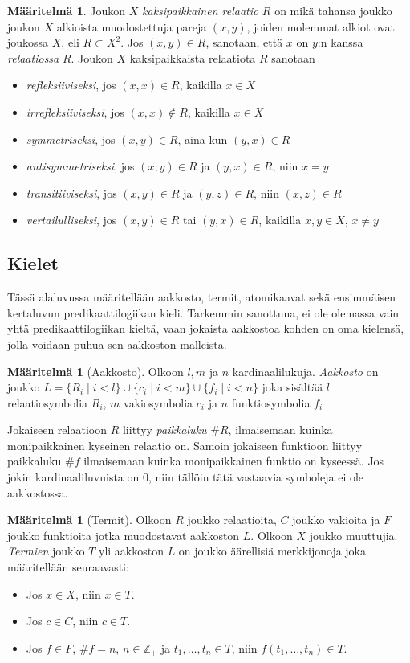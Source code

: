 \documentclass[finnish]{tktltiki2}
\theoremstyle{definition}
\newtheorem{maar}[lau]{Määritelmä}
\theoremstyle{remark}
\begin{document}
\begin{maar}
Joukon $X$ \textit{kaksipaikkainen relaatio} $R$ on mikä tahansa joukko joukon $X$ alkioista muodostettuja pareja $(x, y)$, joiden molemmat alkiot ovat joukossa $X$, eli $R \subset X^2$.  Jos $(x, y) \in R$, sanotaan, että $x$ on $y$:n kanssa \textit{relaatiossa} $R$. Joukon $X$ kaksipaikkaista relaatiota $R$ sanotaan
\begin{itemize}
\item \textit{refleksiiviseksi}, jos $(x, x) \in R$, kaikilla $x \in X$
\item \textit{irrefleksiiviseksi}, jos $(x, x) \notin R$, kaikilla $x \in X$
\item \textit{symmetriseksi}, jos $(x, y) \in R$, aina kun $(y, x) \in R$
\item \textit{antisymmetriseksi}, jos $(x, y) \in R$ ja $(y, x) \in R$, niin $x = y$
\item \textit{transitiiviseksi}, jos $(x, y) \in R$ ja $(y, z) \in R$, niin $(x, z) \in R$
\item \textit{vertailulliseksi}, jos $(x, y) \in R$ tai $(y, x) \in R$, kaikilla $x, y \in X$, $x \neq y$
\end{itemize}
\end{maar}

\subsection{Kielet}
Tässä alaluvussa määritellään aakkosto, termit, atomikaavat sekä ensimmäisen kertaluvun predikaattilogiikan kieli. Tarkemmin sanottuna, ei ole olemassa vain yhtä predikaattilogiikan kieltä, vaan jokaista aakkostoa kohden on oma kielensä, jolla voidaan puhua sen aakkoston malleista.

\begin{maar}[Aakkosto]
Olkoon $l, m$ ja $n$ kardinaalilukuja. \textit{Aakkosto} on joukko $L = \{R_i \mid i < l\} \cup \{c_i \mid i < m\} \cup \{f_i \mid i < n\}$ joka sisältää $l$ relaatiosymbolia $R_i$, $m$ vakiosymbolia $c_i$ ja $n$ funktiosymbolia $f_i$
\end{maar}
Jokaiseen relaatioon $R$ liittyy \textit{paikkaluku} $\#R$, ilmaisemaan kuinka monipaikkainen kyseinen relaatio on. Samoin jokaiseen funktioon liittyy paikkaluku $\#f$ ilmaisemaan kuinka monipaikkainen funktio on kyseessä. Jos jokin kardinaaliluvuista on $0$, niin tällöin tätä vastaavia symboleja ei ole aakkostossa.

\begin{maar}[Termit]
Olkoon $R$ joukko relaatioita, $C$ joukko vakioita ja $F$ joukko funktioita jotka muodostavat aakkoston $L$. Olkoon $X$ joukko muuttujia. \textit{Termien} joukko $T$ yli aakkoston $L$ on joukko äärellisiä merkkijonoja joka määritellään seuraavasti:
\begin{itemize}
\item Jos $x \in X$, niin $x \in T$.
\item Jos $c \in C$, niin $c \in T$.
\item Jos $f \in F$, $\#f = n$, $n\in \mathbb{Z}_+$ ja $t_1, \ldots, t_n \in T$, niin $f(t_1, \ldots, t_n) \in T$.
\end{itemize}
\end{maar}
\end{document}
